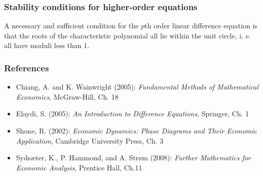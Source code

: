 \documentclass[10pt,usenames,dvipsnames]{beamer}
\theoremstyle{definition}
\begin{document}
\begin{frame}[fragile]
\frametitle{Stability conditions for higher-order equations}
\begin{theorem}
	A necessary and sufficient condition for the $p$th order linear difference equation is that the roots of the characteristic polynomial all lie within the unit circle, i. e. all have moduli less than 1.
\end{theorem}
\end{frame}

\begin{frame}[fragile]
\frametitle{References}
\begin{itemize}
	\item Chiang, A. and K. Wainwright (2005): \emph{Fundamental Methods of Mathematical Economics}, McGraw-Hill, Ch. 18
	\item Elaydi, S. (2005): \emph{An Introduction to Difference Equations}, Springer, Ch. 1
	\item Shone, R. (2002): \emph{Economic Dynamics: Phase Diagrams and Their Economic Application}, Cambridge University Press, Ch. 3
	\item Syds\ae ter, K., P. Hammond, and A. Str\o m (2008): \emph{Further Mathematics for Economic Analysis}, Prentice Hall, Ch.11
\end{itemize}
\end{frame}
\end{document}
